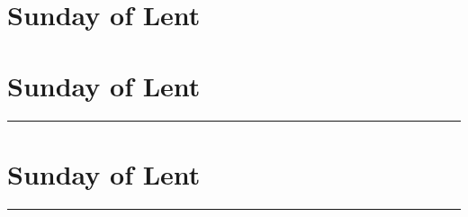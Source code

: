 {{{
\section{ Sunday of Lent}
\printcommonvespers[1]
\def\vrlabel{vr-angelissuis}
\def\hymninput{\gabcfolder/inc-hymn-AudiBenigneConditor}

\bigskip
\benedicamusdomino{}
}

\newcommand{\printhymnnote}{
	\noindent\printnote{Hymn. \emph{Audi, benígne Cónditor}, page \pageref{hymn-audibenigneconditor}.
	\Vbar~\emph{Angelis suis}, page \pageref{vr-angelissuis}.}
}

{
\section{ Sunday of Lent}
\printcommonvespers[1]

\def\commemorations{If today is March 18 or 19, the First Vespers of St Joseph is commemorated as follows.}
\printcommemnote{}
}

\medskip
\hrule
{
\label{stjoseph-commem}
\def\begincollectcols{\begin{parcolumns}[rulebetween,colwidths={1=0.42\linewidth}]{2}}
\def\vrlinebreak{T}

\bigskip
\benedicamusdomino{}
}

{
\section{ Sunday of Lent}
\printcommonvespers[1]

\def\commemorations{If today is March 18 or 19, the First Vespers of St Joseph is commemorated as on page \pageref{stjoseph-commem}.  If today is March 24 or 25, the First Vespers of the Annunciation is commemorated as follows.}
\printcommemnote{}
}

\medskip
\hrule
{
\label{annunciation-commem}

\bigskip
\benedicamusdomino{}
}

\def\commemorations{If today is March 18 or 19, the First Vespers of St Joseph is commemorated as on page \pageref{stjoseph-commem}.  If today is March 24 or 25, the First Vespers of the Annunciation is commemorated as on page \pageref{annunciation-commem}.}
{
}}}
